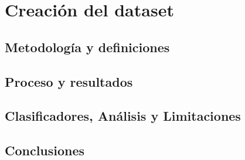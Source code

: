 \documentclass[11pt,a4paper,twoside]{tesis}
\begin{document}
\part{Creación del dataset}

\chapter{Metodología y definiciones}

\chapter{Proceso y resultados}
\chapter{Clasificadores, Análisis y Limitaciones}
\chapter{Conclusiones}


\appendix






\backmatter

\end{document}

